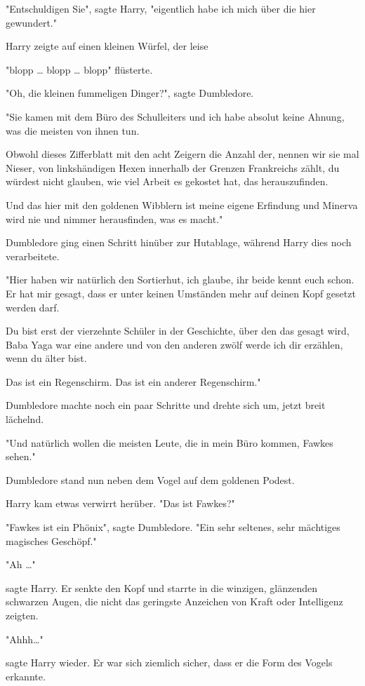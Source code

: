 {"Entschuldigen Sie", sagte Harry, "eigentlich habe ich mich über die hier gewundert."

Harry zeigte auf einen kleinen Würfel, der leise

"blopp … blopp … blopp" flüsterte.

"Oh, die kleinen fummeligen Dinger?", sagte Dumbledore.

"Sie kamen mit dem Büro des Schulleiters und ich habe absolut keine Ahnung, was die meisten von ihnen tun.

Obwohl dieses Zifferblatt mit den acht Zeigern die Anzahl der, nennen wir sie mal Nieser, von linkshändigen Hexen innerhalb der Grenzen Frankreichs zählt, du würdest nicht glauben, wie viel Arbeit es gekostet hat, das herauszufinden.

Und das hier mit den goldenen Wibblern ist meine eigene Erfindung und Minerva wird nie und nimmer herausfinden, was es macht."

Dumbledore ging einen Schritt hinüber zur Hutablage, während Harry dies noch verarbeitete.

"Hier haben wir natürlich den Sortierhut, ich glaube, ihr beide kennt euch schon. Er hat mir gesagt, dass er unter keinen Umständen mehr auf deinen Kopf gesetzt werden darf.

Du bist erst der vierzehnte Schüler in der Geschichte, über den das gesagt wird, Baba Yaga war eine andere und von den anderen zwölf werde ich dir erzählen, wenn du älter bist.

Das ist ein Regenschirm. Das ist ein anderer Regenschirm."

Dumbledore machte noch ein paar Schritte und drehte sich um, jetzt breit lächelnd.

"Und natürlich wollen die meisten Leute, die in mein Büro kommen, Fawkes sehen."

Dumbledore stand nun neben dem Vogel auf dem goldenen Podest.

Harry kam etwas verwirrt herüber. "Das ist Fawkes?"

"Fawkes ist ein Phönix", sagte Dumbledore. "Ein sehr seltenes, sehr mächtiges magisches Geschöpf."

"Ah …"

sagte Harry. Er senkte den Kopf und starrte in die winzigen, glänzenden schwarzen Augen, die nicht das geringste Anzeichen von Kraft oder Intelligenz zeigten.

"Ahhh…"

sagte Harry wieder. Er war sich ziemlich sicher, dass er die Form des Vogels erkannte.

}
